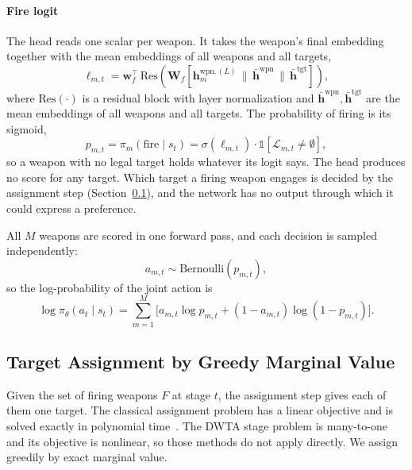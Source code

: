 \paragraph{Fire logit} The head reads one scalar per weapon. It takes the
weapon's final embedding together with the mean embeddings of all weapons and
all targets,
\begin{equation}
\label{eq:fire-logit}
\ell_{m,t} = \bm{w}_f^\top \, \text{Res}\!\left(\bm{W}_f\left[\bm{h}_m^{\text{wpn},(L)} \,\|\, \bar{\bm{h}}^{\text{wpn}} \,\|\, \bar{\bm{h}}^{\text{tgt}}\right]\right),
\end{equation}
where $\text{Res}(\cdot)$ is a residual block with layer normalization and
$\bar{\bm{h}}^{\text{wpn}}, \bar{\bm{h}}^{\text{tgt}}$ are the mean embeddings
of all weapons and all targets. The probability of firing is its sigmoid,
\begin{equation}
\label{eq:fire-prob}
p_{m,t} = \pi_m(\text{fire} \mid s_t) = \sigma(\ell_{m,t}) \cdot \mathbb{1}\!\left[\mathcal{L}_{m,t} \neq \emptyset\right],
\end{equation}
so a weapon with no legal target holds whatever its logit says. The head
produces no score for any target. Which target a firing weapon engages is
decided by the assignment step (Section~\ref{sec:auction}), and the network
has no output through which it could express a preference.

All $M$ weapons are scored in one forward pass, and each decision is sampled
independently:
\begin{equation}
\label{eq:bernoulli}
a_{m,t} \sim \text{Bernoulli}(p_{m,t}),
\end{equation}
so the log-probability of the joint action is
\begin{equation}
\log \pi_\theta(a_t \mid s_t) = \sum_{m=1}^M \big[a_{m,t}\log p_{m,t} + (1-a_{m,t})\log(1-p_{m,t})\big].
\end{equation}

\subsection{Target Assignment by Greedy Marginal Value}
\label{sec:auction}

Given the set of firing weapons $F$ at stage $t$, the assignment step gives
each of them one target. The classical assignment problem has a linear
objective and is solved exactly in polynomial
time~\cite{kuhn1955hungarian,burkard2012assignment}. The DWTA stage problem is
many-to-one and its objective is nonlinear, so those methods do not apply
directly. We assign greedily by exact marginal value.

